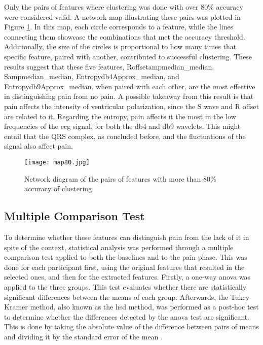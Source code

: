 \pagebreak
Only the pairs of features where clustering was done with over 80\% accuracy were considered valid. A network map illustrating these pairs was plotted in Figure \ref{fig:map80}. In this map, each circle corresponds to a feature, while the lines connecting them showcase the combinations that met the accuracy threshold. Additionally, the size of the circles is proportional to how many times that specific feature, paired with another, contributed to successful clustering. These results suggest that these five features, Roffsetampmedian\_median, Sampmedian\_median, Entropydb4Approx\_median, and Entropydb9Approx\_median, when paired with each other, are the most effective in distinguishing pain from no pain. A possible takeaway from this result is that pain affects the intensity of ventricular polarization, since the S wave and R offset are related to it. Regarding the entropy, pain affects it the most in the low frequencies of the \ac{ecg} signal, for both the db4 and db9 wavelets. This might entail that the QRS complex, as concluded before, and the fluctuations of the signal also affect pain.



\begin{figure}[h!]
    \centering
    \texttt{[image: map80.jpg]}
    \caption{Network diagram of the pairs of features with more than 80\% accuracy of clustering.}
    \label{fig:map80}
\end{figure}



\subsection{Multiple Comparison Test}

To determine whether these features can distinguish pain from the lack of it in spite of the context, statistical analysis was performed through a multiple comparison test applied to both the baselines and to the pain phase. This was done for each participant first, using the original features that resulted in the selected ones, and then for the extracted features. Firstly, a one-way \ac{anova} was applied to the three groups. This test evaluates whether there are statistically significant differences between the means of each group. Afterwards, the Tukey-Kramer method, also known as the \ac{hsd} method, was performed as a post-hoc test to determine whether the differences detected by the \ac{anova} test are significant. This is done by taking the absolute value of the difference between pairs of means and dividing it by the standard error of the mean \cite{Nanda2021}. %

